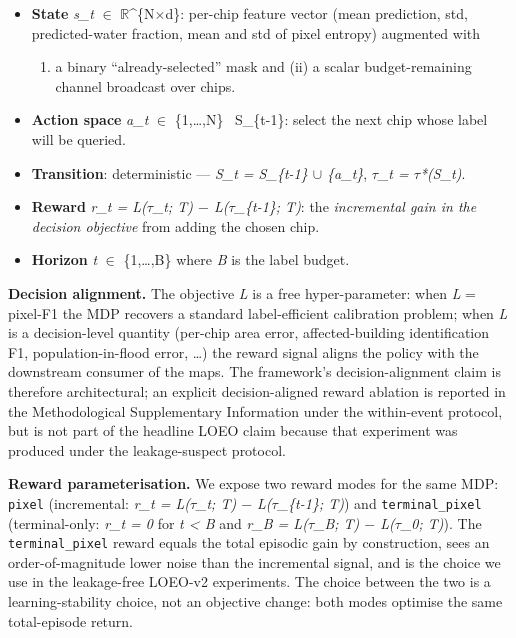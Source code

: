 \documentclass[sn-nature,lineno]{sn-jnl}
\providecommand{\tightlist}{\setlength{\itemsep}{0pt}\setlength{\parskip}{0pt}}
\theoremstyle{thmstyleone}
\theoremstyle{thmstyletwo}
\theoremstyle{thmstylethree}
\begin{document}
\begin{itemize}
\tightlist
\item
  \textbf{State} \emph{s\_t} $\in$ $\mathbb{R}$\^{}\{N$\times$d\}: per-chip feature vector (mean prediction, std,
  predicted-water fraction, mean and std of pixel entropy) augmented with

  \begin{enumerate}
  \def\labelenumi{(\roman{enumi})}
  \tightlist
  \item
    a binary ``already-selected'' mask and (ii) a scalar
    budget-remaining channel broadcast over chips.
  \end{enumerate}
\item
  \textbf{Action space} \emph{a\_t} $\in$ \{1,\ldots,N\} ~S\_\{t-1\}: select the next chip whose
  label will be queried.
\item
  \textbf{Transition}: deterministic --- \emph{S\_t = S\_\{t-1\} $\cup$ \{a\_t\}}, \emph{$\tau$\_t = $\tau$*(S\_t)}.
\item
  \textbf{Reward} \emph{r\_t = L($\tau$\_t; T) $-$ L($\tau$\_\{t-1\}; T)}: the \emph{incremental gain in the
  decision objective} from adding the chosen chip.
\item
  \textbf{Horizon} \emph{t} $\in$ \{1,\ldots,B\} where \emph{B} is the label budget.
\end{itemize}

\textbf{Decision alignment.} The objective \emph{L} is a free hyper-parameter: when
\emph{L} = pixel-F1 the MDP recovers a standard label-efficient calibration
problem; when \emph{L} is a decision-level quantity (per-chip area error,
affected-building identification F1, population-in-flood error, \ldots) the
reward signal aligns the policy with the downstream consumer of the maps.
The framework's decision-alignment claim is therefore architectural; an
explicit decision-aligned reward ablation is reported in the Methodological
Supplementary Information under the within-event protocol, but is not part of
the headline LOEO claim because that experiment was produced under the
leakage-suspect protocol.

\textbf{Reward parameterisation.} We expose two reward modes for the same MDP:
\texttt{pixel} (incremental: \emph{r\_t = L($\tau$\_t; T) $-$ L($\tau$\_\{t-1\}; T)}) and
\texttt{terminal\_pixel} (terminal-only: \emph{r\_t = 0} for \emph{t \textless{} B} and
\emph{r\_B = L($\tau$\_B; T) $-$ L($\tau$\_0; T)}). The \texttt{terminal\_pixel} reward equals the
total episodic gain by construction, sees an order-of-magnitude lower noise
than the incremental signal, and is the choice we use in the leakage-free
LOEO-v2 experiments. The choice between the two is a learning-stability
choice, not an objective change: both modes optimise the same total-episode
return.
\end{document}
